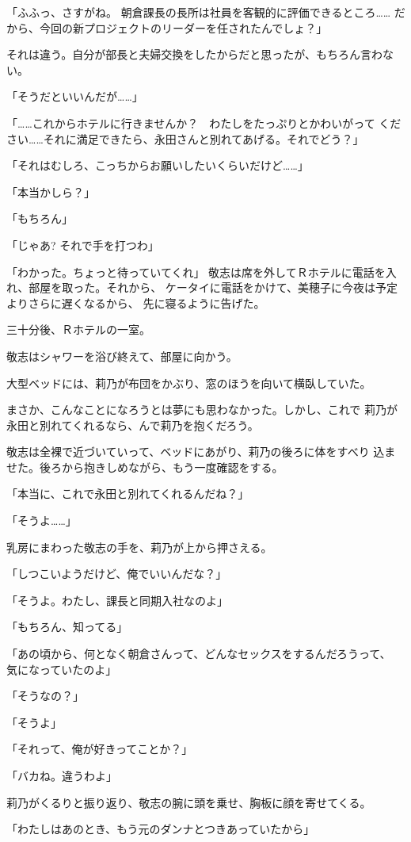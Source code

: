 ﻿\documentclass[
    book,tate,
    line_length=30zw,
    jafontsize=12pt,
    paper=b5j,
    landscape,
    ]{jlreq}
\begin{document}
「ふふっ、さすがね。 朝倉課長の長所は社員を客観的に評価できるところ……
だから、今回の新プロジェクトのリーダーを任されたんでしょ？」

それは違う。自分が部長と夫婦交換をしたからだと思ったが、もちろん言わない。

「そうだといいんだが……」

「……これからホテルに行きませんか？　わたしをたっぷりとかわいがって
ください……それに満足できたら、永田さんと別れてあげる。それでどう？」

「それはむしろ、こっちからお願いしたいくらいだけど……」

「本当かしら？」

「もちろん」

「じゃあ? それで手を打つわ」

「わかった。ちょっと待っていてくれ」
敬志は席を外してＲホテルに電話を入れ、部屋を取った。それから、
ケータイに電話をかけて、美穂子に今夜は予定よりさらに遅くなるから、
先に寝るように告げた。

三十分後、Ｒホテルの一室。

敬志はシャワーを浴び終えて、部屋に向かう。

大型ベッドには、莉乃が布団をかぶり、窓のほうを向いて横臥していた。

まさか、こんなことになろうとは夢にも思わなかった。しかし、これで
莉乃が永田と別れてくれるなら、んで莉乃を抱くだろう。

敬志は全裸で近づいていって、ベッドにあがり、莉乃の後ろに体をすべり
込ませた。後ろから抱きしめながら、もう一度確認をする。

「本当に、これで永田と別れてくれるんだね？」

「そうよ……」

乳房にまわった敬志の手を、莉乃が上から押さえる。

「しつこいようだけど、俺でいいんだな？」

「そうよ。わたし、課長と同期入社なのよ」

「もちろん、知ってる」

「あの頃から、何となく朝倉さんって、どんなセックスをするんだろうって、
気になっていたのよ」

「そうなの？」

「そうよ」

「それって、俺が好きってことか？」

「バカね。違うわよ」

莉乃がくるりと振り返り、敬志の腕に頭を乗せ、胸板に顔を寄せてくる。

「わたしはあのとき、もう元のダンナとつきあっていたから」
\end{document}

